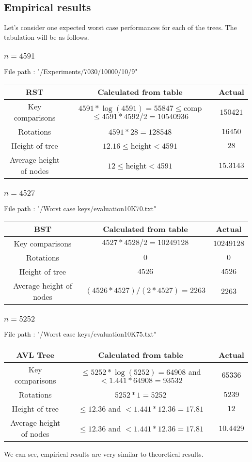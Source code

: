 \documentclass{article}
\begin{document}
\subsection{Empirical results}
Let's consider one expected worst case performances for each of the trees. The tabulation will be as follows.
\subsubsection{$n=4591$}
File path : "/Experiments/7030/10000/10/9"
\begin{center}
\begin{tabular}{||c || c | c||} 
\hline
RST & Calculated from table & Actual \\
\hline\hline
Key comparisons & $4591*\log(4591)=55847\le$comp$\le 4591*4592/2=10540936$ & $150421$ \\
\hline
Rotations & $4591*28=128548$ & $16450$ \\
\hline
Height of tree & $12.16\le$height$<4591$ & $28$ \\
\hline
Average height of nodes & $12\le$height$<4591$ & $15.3143$ \\
\hline
\end{tabular}
\end{center}
\subsubsection{$n=4527$}
File path : "/Worst case keys/evaluation10K70.txt"
\begin{center}
\begin{tabular}{||c || c | c||} 
\hline
BST & Calculated from table & Actual \\
\hline\hline
Key comparisons & $4527*4528/2=10249128$ & $10249128$ \\ 
\hline
Rotations & $0$ & $0$ \\
\hline
Height of tree & $4526$ & $4526$ \\
\hline
Average height of nodes & $(4526*4527)/(2*4527)=2263$ & $2263$ \\
\hline
\end{tabular}
\end{center}
\subsubsection{$n=5252$}
File path : "/Worst case keys/evaluation10K75.txt"
\begin{center}
\begin{tabular}{||c || c | c||} 
\hline
AVL Tree & Calculated from table & Actual \\
\hline\hline
Key comparisons & $\le 5252*\log(5252)=64908$ and $<1.441*64908=93532$ & $65336$ \\ 
\hline
Rotations & $5252*1=5252$ & $5239$ \\
\hline
Height of tree & $\le 12.36$ and $<1.441*12.36=17.81$ & $12$ \\
\hline
Average height of nodes & $\le 12.36$ and $<1.441*12.36=17.81$ & $10.4429$ \\
\hline
\end{tabular}
\end{center}
We can see, empirical results are very similar to theoretical results.
\end{document}
